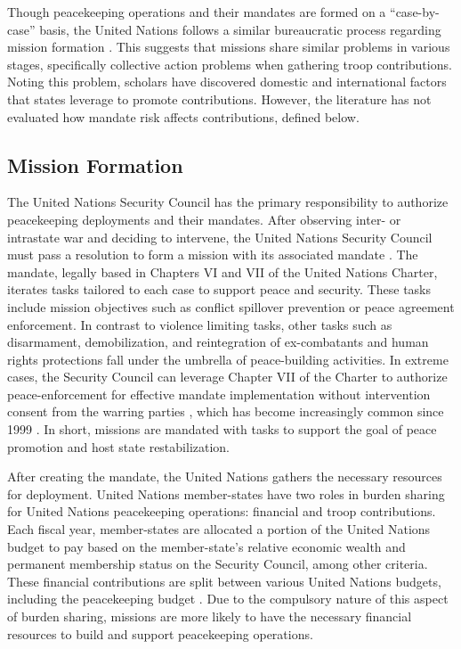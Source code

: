 \documentclass[12pt]{article}
\begin{document}
Though peacekeeping operations and their mandates are formed on a ``case-by-case'' basis, the United Nations follows a similar bureaucratic process regarding mission formation \citep{UN_SC}. This suggests that missions share similar problems in various stages, specifically collective action problems when gathering troop contributions. Noting this problem, scholars have discovered domestic and international factors that states leverage to promote contributions. However, the literature has not evaluated how mandate risk affects contributions, defined below. 

\subsection*{Mission Formation}

The United Nations Security Council has the primary responsibility to authorize peacekeeping deployments and their mandates. After observing inter- or intrastate war and deciding to intervene, the United Nations Security Council must pass a resolution to form a mission with its associated mandate \citep{UN_SC}. The mandate, legally based in Chapters VI and VII of the United Nations Charter, iterates tasks tailored to each case to support peace and security. These tasks include mission objectives such as conflict spillover prevention or peace agreement enforcement. In contrast to violence limiting tasks, other tasks such as disarmament, demobilization, and reintegration of ex-combatants and human rights protections fall under the umbrella of peace-building activities. In extreme cases, the Security Council can leverage Chapter VII of the Charter to authorize peace-enforcement for effective mandate implementation without intervention consent from the warring parties \citep{mandate.online}, which has become increasingly common since 1999 \citep{howard2018use}. In short, missions are mandated with tasks to support the goal of peace promotion and host state restabilization. 


After creating the mandate, the United Nations gathers the necessary resources for deployment. United Nations member-states have two roles in burden sharing for United Nations peacekeeping operations: financial and troop contributions. Each fiscal year, member-states are allocated a portion of the United Nations budget to pay based on the member-state's relative economic wealth and permanent membership status on the Security Council, among other criteria. These financial contributions are split between various United Nations budgets, including the peacekeeping budget \citep{coleman2020}. Due to the compulsory nature of this aspect of burden sharing, missions are more likely to have the necessary financial resources to build and support peacekeeping operations.\footnotemark[1]
\end{document}
